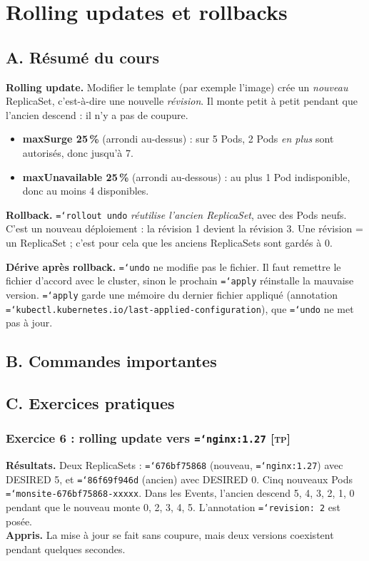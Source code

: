 \documentclass[11pt,a4paper]{article}
\newcommand{\cmd}[1]{\texttt{\hyphenchar\font=`\-#1}}
\newcommand{\tp}{\textsc{[tp]}}
\newcommand{\partie}[1]{\needspace{9\baselineskip}\subsection*{#1}}
\newcommand{\exo}[1]{\needspace{8\baselineskip}\subsubsection*{#1}}
\begin{document}
\section{Rolling updates et rollbacks}

\partie{A. Résumé du cours}
\textbf{Rolling update.} Modifier le template (par exemple l'image) crée un \emph{nouveau} ReplicaSet, c'est-à-dire une nouvelle \emph{révision}. Il monte petit à petit pendant que l'ancien descend : il n'y a pas de coupure.
\begin{itemize}
  \item \textbf{maxSurge 25\,\%} (arrondi au-dessus) : sur 5 Pods, 2 Pods \emph{en plus} sont autorisés, donc jusqu'à 7.
  \item \textbf{maxUnavailable 25\,\%} (arrondi au-dessous) : au plus 1 Pod indisponible, donc au moins 4 disponibles.
\end{itemize}

\textbf{Rollback.} \cmd{rollout undo} \emph{réutilise l'ancien ReplicaSet}, avec des Pods neufs. C'est un nouveau déploiement : la révision 1 devient la révision 3. Une révision = un ReplicaSet ; c'est pour cela que les anciens ReplicaSets sont gardés à 0.

\textbf{Dérive après rollback.} \cmd{undo} ne modifie pas le fichier. Il faut remettre le fichier d'accord avec le cluster, sinon le prochain \cmd{apply} réinstalle la mauvaise version.
\cmd{apply} garde une mémoire du dernier fichier appliqué (annotation \cmd{kubectl.kubernetes.io/last-applied-configuration}), que \cmd{undo} ne met pas à jour.

\partie{B. Commandes importantes}

\partie{C. Exercices pratiques}
\exo{Exercice 6 : rolling update vers \cmd{nginx:1.27} \tp}
\textbf{Résultats.} Deux ReplicaSets : \cmd{676bf75868} (nouveau, \cmd{nginx:1.27}) avec DESIRED 5, et \cmd{86f69f946d} (ancien) avec DESIRED 0. Cinq nouveaux Pods \cmd{monsite-676bf75868-xxxxx}.
Dans les Events, l'ancien descend 5, 4, 3, 2, 1, 0 pendant que le nouveau monte 0, 2, 3, 4, 5. L'annotation \cmd{revision: 2} est posée.\\
\textbf{Appris.} La mise à jour se fait sans coupure, mais deux versions coexistent pendant quelques secondes.
\end{document}
